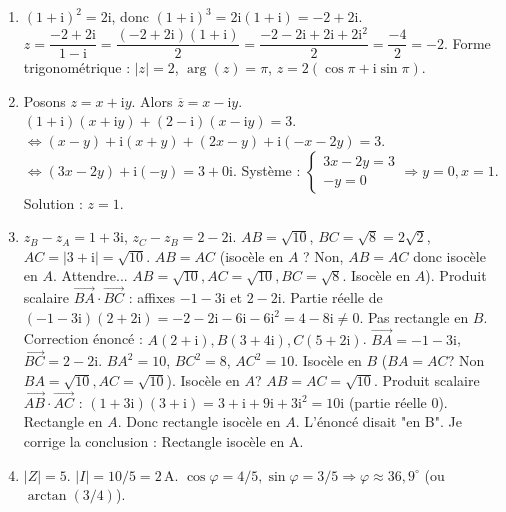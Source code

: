 \documentclass[11pt]{article}
\begin{document}
\begin{corrige}[Exercice n°1]
\begin{enumerate}
\item $(1+\mathrm{i})^2 = 2\mathrm{i}$, donc $(1+\mathrm{i})^3 = 2\mathrm{i}(1+\mathrm{i}) = -2 + 2\mathrm{i}$.
$z = \dfrac{-2+2\mathrm{i}}{1-\mathrm{i}} = \dfrac{(-2+2\mathrm{i})(1+\mathrm{i})}{2} = \dfrac{-2-2\mathrm{i}+2\mathrm{i}+2\mathrm{i}^2}{2} = \dfrac{-4}{2} = -2$.
Forme trigonométrique : $|z|=2$, $\arg(z)=\pi$, $z = 2(\cos\pi + \mathrm{i}\sin\pi)$.
\item Posons $z = x+\mathrm{i}y$. Alors $\overline{z} = x-\mathrm{i}y$.
$(1+\mathrm{i})(x+\mathrm{i}y) + (2-\mathrm{i})(x-\mathrm{i}y) = 3$.
$\Leftrightarrow (x-y) + \mathrm{i}(x+y) + (2x-y) + \mathrm{i}(-x-2y) = 3$.
$\Leftrightarrow (3x-2y) + \mathrm{i}(-y) = 3 + 0\mathrm{i}$.
Système : $\begin{cases} 3x-2y = 3 \\ -y = 0 \end{cases} \Rightarrow y=0, x=1$.
Solution : $z = 1$.
\item $z_B - z_A = 1+3\mathrm{i}$, $z_C - z_B = 2-2\mathrm{i}$.
$AB = \sqrt{10}$, $BC = \sqrt{8} = 2\sqrt{2}$, $AC = |3+\mathrm{i}| = \sqrt{10}$.
$AB = AC$ (isocèle en $A$ ? Non, $AB=AC$ donc isocèle en $A$. Attendre... $AB=\sqrt{10}, AC=\sqrt{10}, BC=\sqrt{8}$. Isocèle en $A$).
Produit scalaire $\overrightarrow{BA}\cdot\overrightarrow{BC}$ : affixes $-1-3\mathrm{i}$ et $2-2\mathrm{i}$. Partie réelle de $(-1-3\mathrm{i})(2+2\mathrm{i}) = -2-2\mathrm{i}-6\mathrm{i}-6\mathrm{i}^2 = 4-8\mathrm{i} \neq 0$. Pas rectangle en $B$.
Correction énoncé : $A(2+\mathrm{i}), B(3+4\mathrm{i}), C(5+2\mathrm{i})$.
$\overrightarrow{BA} = -1-3\mathrm{i}$, $\overrightarrow{BC} = 2-2\mathrm{i}$.
$BA^2 = 10$, $BC^2 = 8$, $AC^2 = 10$. Isocèle en $B$ ($BA=AC$? Non $BA=\sqrt{10}, AC=\sqrt{10}$). Isocèle en $A$? $AB=AC=\sqrt{10}$.
Produit scalaire $\overrightarrow{AB}\cdot\overrightarrow{AC}$ : $(1+3\mathrm{i})(3+\mathrm{i}) = 3+\mathrm{i}+9\mathrm{i}+3\mathrm{i}^2 = 10\mathrm{i}$ (partie réelle 0). Rectangle en $A$.
Donc rectangle isocèle en $A$. L'énoncé disait "en B". Je corrige la conclusion : Rectangle isocèle en A.
\item $|Z| = 5$. $|I| = 10/5 = 2\,\mathrm{A}$. $\cos\varphi = 4/5, \sin\varphi = 3/5 \Rightarrow \varphi \approx 36,9^\circ$ (ou $\arctan(3/4)$).
\end{enumerate}
\end{corrige}

\newpage
\end{document}
